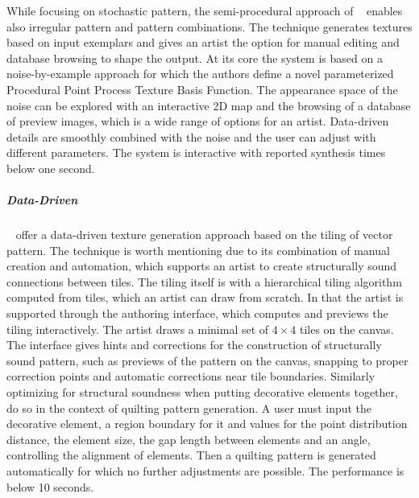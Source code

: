 While focusing on stochastic pattern, the semi-procedural approach of \citeauthor*{guehl_2020_stu}~\cite{guehl_2020_stu} enables also irregular pattern and pattern combinations. The technique
generates textures based on input exemplars and gives an artist the option for manual editing and database browsing to shape the output. At its core the system is based on a noise-by-example approach for which the authors define a novel parameterized Procedural Point Process Texture Basis Function. The appearance space of the noise can be explored with an interactive 2D map and the browsing of a database of preview images, which is a wide range of options for an artist. Data-driven details are smoothly combined with the noise and the user can adjust with different parameters. The system is interactive with reported synthesis times below one second.


\subparagraph*{Data-Driven}
\label{subpara:analysis_regular_tilings}

\citeauthor*{bian_2018_tpd}~\cite{bian_2018_tpd} offer a data-driven texture generation approach based on the tiling of vector pattern. The technique is worth mentioning due to its combination of manual creation and automation, which supports an artist to create structurally sound connections between tiles. The tiling itself is with a hierarchical tiling algorithm computed from tiles, which an artist can draw from scratch. In that the artist is supported through the authoring interface, which computes and previews the tiling interactively. The artist draws a minimal set of $4\times4$ tiles on the canvas. The interface gives hints and corrections for the construction of structurally sound pattern, such as previews of the pattern on the canvas, snapping to proper correction points and automatic corrections near tile boundaries. Similarly optimizing for structural soundness when putting decorative elements together,~\citeauthor*{li_2019_aqp}~\cite{li_2019_aqp} do so in the context of quilting pattern generation. A user must input the decorative element, a region boundary for it and values for the point distribution distance, the element size, the gap length between elements and an angle, controlling the alignment of elements. Then a quilting pattern is generated automatically for which no further adjustments are possible. The performance is below 10 seconds.


